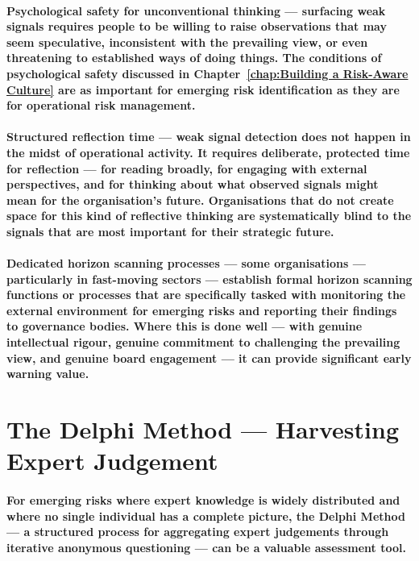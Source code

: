 \paragraph{\textbf{Psychological safety for unconventional thinking} — surfacing weak signals requires people to be willing to raise observations that may seem speculative, inconsistent with the prevailing view, or even threatening to established ways of doing things. The conditions of psychological safety discussed in Chapter~\ref{chap:Building a Risk-Aware Culture} are as important for emerging risk identification as they are for operational risk management.}
\paragraph{\textbf{Structured reflection time} — weak signal detection does not happen in the midst of operational activity. It requires deliberate, protected time for reflection — for reading broadly, for engaging with external perspectives, and for thinking about what observed signals might mean for the organisation's future. Organisations that do not create space for this kind of reflective thinking are systematically blind to the signals that are most important for their strategic future.}
\paragraph{\textbf{Dedicated horizon scanning processes} — some organisations — particularly in fast-moving sectors — establish formal horizon scanning functions or processes that are specifically tasked with monitoring the external environment for emerging risks and reporting their findings to governance bodies. Where this is done well — with genuine intellectual rigour, genuine commitment to challenging the prevailing view, and genuine board engagement — it can provide significant early warning value.}

\section{The Delphi Method — Harvesting Expert Judgement}
\paragraph{For emerging risks where expert knowledge is widely distributed and where no single individual has a complete picture, the \textbf{Delphi Method} — a structured process for aggregating expert judgements through iterative anonymous questioning — can be a valuable assessment tool.}

